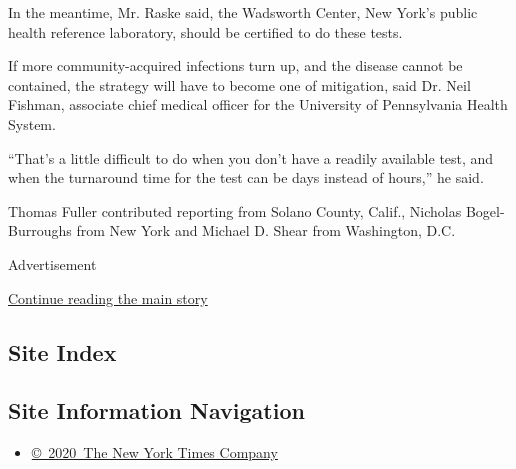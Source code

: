 In the meantime, Mr. Raske said, the Wadsworth Center, New York's public
health reference laboratory, should be certified to do these tests.

If more community-acquired infections turn up, and the disease cannot be
contained, the strategy will have to become one of mitigation, said Dr.
Neil Fishman, associate chief medical officer for the University of
Pennsylvania Health System.

``That's a little difficult to do when you don't have a readily
available test, and when the turnaround time for the test can be days
instead of hours,'' he said.

Thomas Fuller contributed reporting from Solano County, Calif., Nicholas
Bogel-Burroughs from New York and Michael D. Shear from Washington, D.C.

Advertisement

\protect\hyperlink{after-bottom}{Continue reading the main story}

\hypertarget{site-index}{%
\subsection{Site Index}\label{site-index}}

\hypertarget{site-information-navigation}{%
\subsection{Site Information
Navigation}\label{site-information-navigation}}

\begin{itemize}
\tightlist
\item
  \href{https://help.nytimes3xbfgragh.onion/hc/en-us/articles/115014792127-Copyright-notice}{©~2020~The
  New York Times Company}
\end{itemize}

